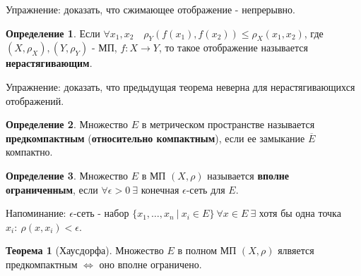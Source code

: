 \documentclass{report}
\theoremstyle{definition}
\newtheorem{definition}{Определение}[section]
\newtheorem{theorem}{Теорема}[section]
\begin{document}
Упражнение: доказать, что сжимающее отображение - непрерывно.

\begin{definition}
  Если $\forall x_1,x_2 \quad \rho_Y (f(x_1),f(x_2)) \leqslant \rho_X(x_1,x_2)$, где \\ $(X,\rho_X),(Y,\rho_Y)$ - МП,
  $f:X\rightarrow Y$, то такое отображение называется \textbf{нерастягивающим}.
\end{definition}

Упражнение: доказать, что предыдущая теорема неверна для нерастягивающихся отображений.

\begin{definition}
  Множество $E$ в метрическом пространстве называется \textbf{предкомпактным} (\textbf{относительно компактным}),
  если ее замыкание $\overline{E}$ компактно.
\end{definition}

\begin{definition}
  Множество $E$ в МП $(X,\rho)$ называется \textbf{вполне ограниченным}, если $\forall \epsilon > 0 \ \exists$
  конечная $\epsilon$-сеть для $E$.

  Напоминание: $\epsilon$-сеть - набор $\{x_1,\ldots,x_n \ | \ x_i \in E\} \ \forall x \in E \ \exists$ хотя бы
  одна точка $x_i: \ \rho(x,x_i) < \epsilon$.
\end{definition}

\begin{theorem}[Хаусдорфа]
  Множество $E$ в полном МП $(X,\rho)$ ялвяется предкомпактным $\iff$ оно вполне ограничено.
\end{theorem}
\end{document}
